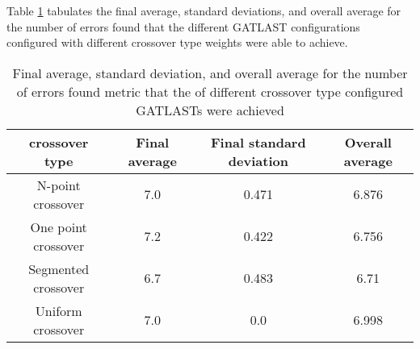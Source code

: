 Table \ref{tab:HP:GA:crossOverType:number of errors found} tabulates the final average, standard deviations, and overall average for the number of errors found that the different GATLAST configurations configured with different crossover type weights were able to achieve.
\begin{table}[tbh!]
\centering
\begin{adjustbox}{trim=0cm 0cm 0cm 0cm, clip=true}
\begin{tabular}{|c|c|c|c|}
\hline
crossover type & Final average & Final standard deviation & Overall average\\
\hline
N-point crossover & 7.0 & 0.471 & 6.876\\\hline
One point crossover & 7.2 & 0.422 & 6.756\\\hline
Segmented crossover & 6.7 & 0.483 & 6.71\\\hline
Uniform crossover & 7.0 & 0.0 & 6.998\\\hline
\end{tabular}
\end{adjustbox}
\caption{Final average, standard deviation, and overall average for the number of errors found metric that the of different crossover type configured GATLASTs were achieved}
\label{tab:HP:GA:crossOverType:number of errors found}
\end{table}